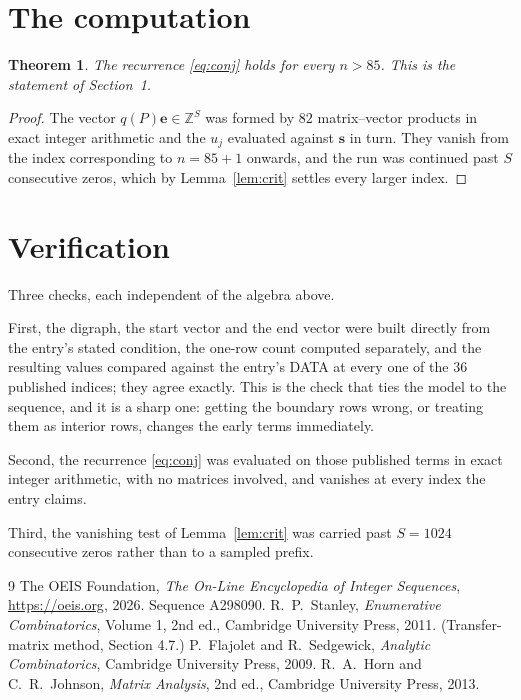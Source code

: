 \documentclass[11pt,a4paper]{article}
\theoremstyle{plain}
\newtheorem{theorem}{Theorem}
\theoremstyle{definition}
\begin{document}
\section{The computation}

\begin{theorem}
The recurrence \eqref{eq:conj} holds for every $n>85$. This is the statement of
Section~1.
\end{theorem}

\begin{proof}
The vector $q(P)\mathbf{e}\in\mathbb{Z}^{S}$ was formed by $82$ matrix--vector
products in exact integer arithmetic and the $u_j$ evaluated against $\mathbf{s}$ in turn.
They vanish from the index corresponding to $n=85+1$ onwards, and the run was continued
past $S$ consecutive zeros, which by Lemma~\ref{lem:crit} settles every larger index.
\end{proof}

\section{Verification}

Three checks, each independent of the algebra above.

First, the digraph, the start vector and the end vector were built directly from the
entry's stated condition, the one-row count computed separately, and the resulting values
compared against the entry's DATA at every one of the $36$ published indices; they
agree exactly. This is the check that ties the model to the sequence, and it is a sharp one:
getting the boundary rows wrong, or treating them as interior rows, changes the early terms
immediately.

Second, the recurrence \eqref{eq:conj} was evaluated on those published terms in exact
integer arithmetic, with no matrices involved, and vanishes at every index the entry claims.

Third, the vanishing test of Lemma~\ref{lem:crit} was carried past $S=1024$ consecutive
zeros rather than to a sampled prefix.

\begin{thebibliography}{9}
 The OEIS Foundation, \emph{The On-Line Encyclopedia of Integer
Sequences}, \url{https://oeis.org}, 2026. Sequence A298090.
 R.~P.~Stanley, \emph{Enumerative Combinatorics}, Volume 1, 2nd ed.,
Cambridge University Press, 2011. (Transfer-matrix method, Section 4.7.)
 P.~Flajolet and R.~Sedgewick, \emph{Analytic Combinatorics}, Cambridge
University Press, 2009.
 R.~A.~Horn and C.~R.~Johnson, \emph{Matrix Analysis}, 2nd ed., Cambridge
University Press, 2013.
\end{thebibliography}
\end{document}
